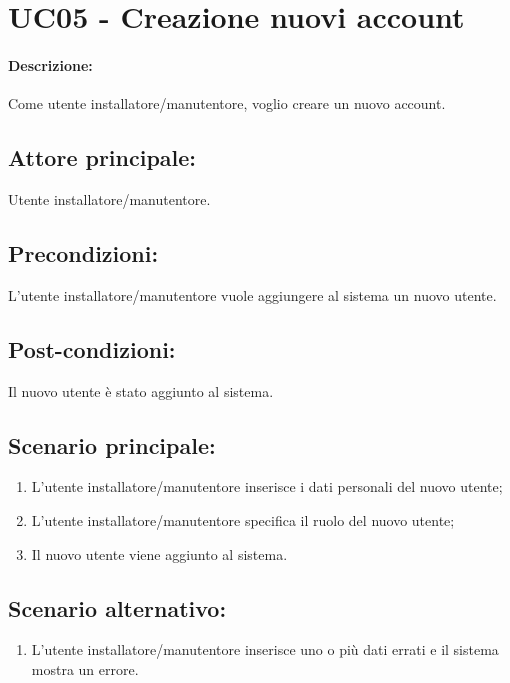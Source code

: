 \section{UC05 - Creazione nuovi account}

\paragraph{Descrizione:}
Come utente installatore/manutentore, voglio creare un nuovo account.

\subsection{Attore principale:}
Utente installatore/manutentore.

\subsection{Precondizioni:}
L'utente installatore/manutentore vuole aggiungere al sistema un nuovo utente.

\subsection{Post-condizioni:}
Il nuovo utente è stato aggiunto al sistema.

\subsection{Scenario principale:}
\begin{enumerate}
    \item L'utente installatore/manutentore inserisce i dati personali del nuovo utente; %
    \item L'utente installatore/manutentore specifica il ruolo del nuovo utente;
    \item Il nuovo utente viene aggiunto al sistema.
\end{enumerate}

\subsection{Scenario alternativo:}
\begin{enumerate}
    \item L'utente installatore/manutentore inserisce uno o più dati errati e il sistema mostra un errore.
\end{enumerate}